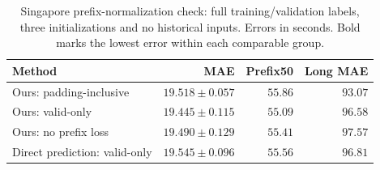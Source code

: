 \begin{table}[t]
\centering\footnotesize\setlength{\tabcolsep}{4pt}
\caption{Singapore prefix-normalization check: full training/validation labels, three initializations and no historical inputs. Errors in seconds. Bold marks the lowest error within each comparable group.}\label{tab:prefix_fixed}
\begin{tabular}{lrrr}\toprule
Method & MAE & Prefix50 & Long MAE\\\midrule
Ours: padding-inclusive & $19.518\pm0.057$ & $55.86$ & $\mathbf{93.07}$\\
Ours: valid-only & $\mathbf{19.445\pm0.115}$ & $\mathbf{55.09}$ & $96.58$\\
Ours: no prefix loss & $19.490\pm0.129$ & $55.41$ & $97.57$\\
Direct prediction: valid-only & $19.545\pm0.096$ & $55.56$ & $96.81$\\
\bottomrule\end{tabular}
\end{table}
